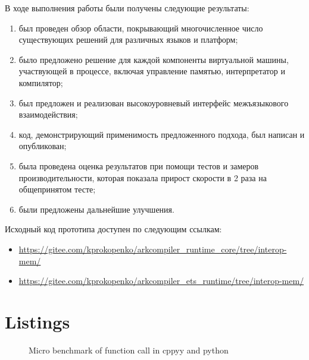 \documentclass[times,specification,annotation]{itmo-student-thesis}
\begin{document}
\startconclusionpage
В ходе выполнения работы были получены следующие результаты:
\begin{enumerate}
	\item был проведен обзор области, покрывающий многочисленное число существующих решений для различных языков и платформ;
	\item было предложено решение для каждой компоненты виртуальной машины, участвующей в процессе, включая управление памятью, интерпретатор и компилятор;
	\item был предложен и реализован высокоуровневый интерфейс межъязыкового взаимодействия;
	\item код, демонстрирующий применимость предложенного подхода, был написан и опубликован;
	\item была проведена оценка результатов при помощи тестов и замеров производительности, которая показала прирост скорости в 2 раза на общепринятом тесте;
	\item были предложены дальнейшие улучшения.
\end{enumerate}
Исходный код прототипа доступен по следующим ссылкам:
\begin{itemize}
	\item \url{https://gitee.com/kprokopenko/arkcompiler_runtime_core/tree/interop-mem/}
	\item \url{https://gitee.com/kprokopenko/arkcompiler_ets_runtime/tree/interop-mem/}
\end{itemize}

\printmainbibliography
\appendix

\chapter{Listings}
\begin{figure}[!h]
	\caption{Micro benchmark of function call in cppyy and python}\label{apx:cppyy-bench}
	
\end{figure}
\end{document}
